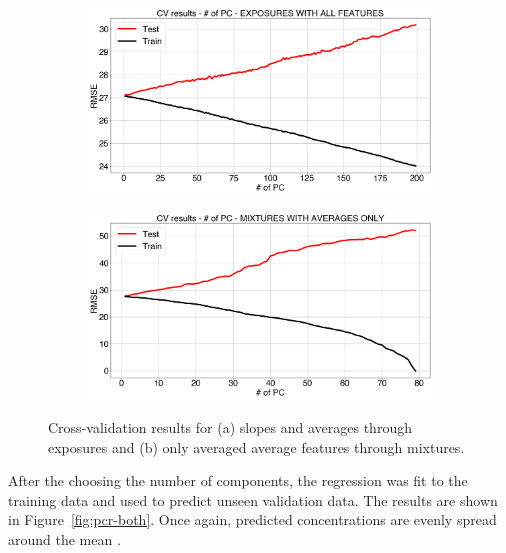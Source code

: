 \begin{figure}[!htb]
	\centering
	
	\begin{subfigure}[t]{0.5\textwidth}
		\includegraphics[width=1\linewidth]{../figures/pcr-cv.png}
		\caption{}
		\label{fig:pcr-cv} 
	\end{subfigure}
	
	\begin{subfigure}[t]{0.5\textwidth}
		\includegraphics[width=1\linewidth]{../figures/pcr-cv-avg-feat.png}
		\caption{}
		\label{fig:pcr-cv-averaged}
	\end{subfigure}
	
	\caption{Cross-validation results for (a) slopes and averages through exposures and (b) only averaged average features through mixtures.}
	\label{fig:pcr-cv-both}
\end{figure}

After the choosing the number of components, the regression was fit to the training data and used to predict unseen validation data. The results are shown in Figure~\ref{fig:pcr-both}. Once again, predicted concentrations are evenly spread around the mean .

